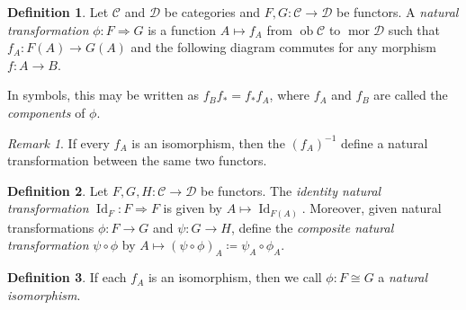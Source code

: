 \documentclass[10pt,letterpaper,cm]{nupset}
\theoremstyle{definition}
\newtheorem{definition}{Definition}
\theoremstyle{theorem}
\theoremstyle{remark}
\newtheorem{remark}{Remark}
\newcommand{\1}{\mathbf{1}}
\renewcommand{\c}{\mathscr{C}}
\renewcommand{\d}{\mathscr{D}}
\newcommand{\0}{\vec 0}
\DeclareMathOperator{\id}{Id}
\DeclareMathOperator{\ob}{ob}
\DeclareMathOperator{\mor}{mor}
\begin{document}
\begin{abstract}
More basic category theory. The main sources for this talk are the following.
\begin{itemize}
\item \textit{nLab}.
\item John Rognes's \textit{Lecture Notes on Algebraic K-Theory}, Ch. 3.
\item Peter Johnstone's lecture notes for ``Category Theory" (Mathematical Tripos Part III, Michaelmas 2015), Ch. 1.
\end{itemize}
\end{abstract}

\begin{definition}
Let $\c$ and $\d$ be categories and $F,G: \c \to \d$ be functors.  A \textit{natural transformation} $\phi :F \Rightarrow G$  is a function $A \mapsto f_A$ from $\ob \c$ to $\mor \d$ such that $f_A : F(A) \to G(A)$ and the following diagram commutes for any morphism $f: A \to B$.

\begin{center}
\end{center}
In symbols, this may be written as $f_Bf_{\ast} = f_{\ast}f_A$, where $f_A$ and $f_B$ are called the \textit{components} of $\phi$.
\end{definition}

\begin{remark}\label{rmk}
If every $f_A$ is an isomorphism, then the $(f_A)^{-1}$ define a natural transformation between the same two functors.
\end{remark}

\begin{definition}
Let $F, G, H: \c \to \d$ be functors. The \textit{identity natural transformation} $\id_F : F \Rightarrow F$ is given by $A \mapsto \id_{F(A)}$. Moreover, given natural transformations $\phi: F \to G$ and $\psi: G \to H$, define the \textit{composite natural transformation} $\psi \circ \phi$ by $A \mapsto (\psi \circ \phi)_A \coloneqq \psi_{A} \circ \phi_{A}$.
\end{definition}


\begin{definition}
If each $f_A$ is an isomorphism, then we call $\phi: F \cong G$ a \textit{natural isomorphism}.
\end{definition}
\end{document}

